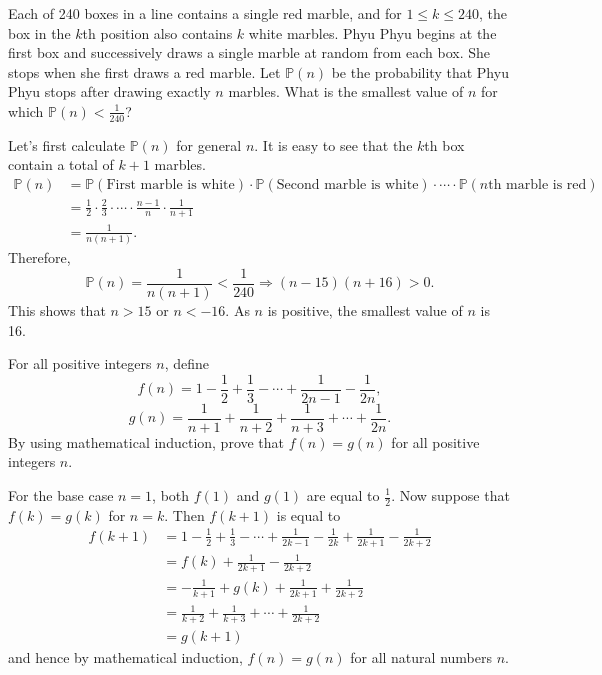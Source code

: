 \begin{question}
    Each of 240 boxes in a line contains a single red marble, and for $1 \leq k
    \leq 240$, the box in the $k$th position also contains $k$ white marbles.
    Phyu Phyu begins at the first box and successively draws a single marble at
    random from each box. She stops when she first draws a red marble. Let
    $\mathbb{P}(n)$ be the probability that Phyu Phyu stops after drawing
    exactly $n$ marbles. What is the smallest value of $n$ for which
    $\mathbb{P}(n) < \frac{1}{240}$?
\end{question}
\begin{solution}
    Let's first calculate $\mathbb{P}(n)$ for general $n$. It is easy to see
    that the $k$th box contain a total of $k + 1$ marbles.
    \begin{align*}
        \mathbb{P}(n) &= \mathbb{P}(\text{First marble is white}) \cdot \mathbb{P}(\text{Second marble is white}) \cdot \cdots \cdot \mathbb{P}(\text{$n$th marble is red})\\
        &= \frac{1}{2} \cdot \frac{2}{3} \cdot \cdots \cdot \frac{n - 1}{n} \cdot \frac{1}{n + 1}\\
        &= \frac{1}{n(n + 1)}.
    \end{align*}
    Therefore,
    \[ \mathbb{P}(n) = \frac{1}{n(n + 1)} < \frac{1}{240} \Longrightarrow (n -
    15)(n + 16) > 0. \]
    This shows that $n > 15$ or $n < -16$. As $n$ is positive, the smallest
    value of $n$ is 16.
\end{solution}

\begin{question}
    For all positive integers $n$, define 
    \[f(n) = 1 - \frac{1}{2} + \frac{1}{3} - \cdots + \frac{1}{2n-1} -
    \frac{1}{2n},\]
    \[g(n) = \frac{1}{n + 1} + \frac{1}{n + 2} + \frac{1}{n + 3} + \cdots +
    \frac{1}{2n}.\]
    By using mathematical induction, prove that $f(n) = g(n)$ for all positive
    integers $n$.
\end{question}
\begin{solution}
    For the base case $n = 1$, both $f(1)$ and $g(1)$ are equal to
    $\frac{1}{2}$. Now suppose that $f(k) = g(k)$ for $n = k$. Then $f(k + 1)$
    is equal to
    \begin{align*}
        f(k + 1) &= 1 - \frac{1}{2} + \frac{1}{3} - \cdots + \frac{1}{2k - 1} - \frac{1}{2k} + \frac{1}{2k + 1} - \frac{1}{2k + 2}\\
        &= f(k) + \frac{1}{2k + 1} - \frac{1}{2k + 2}\\
        &= - \frac{1}{k + 1} + g(k) + \frac{1}{2k + 1} + \frac{1}{2k + 2}\\
        &= \frac{1}{k + 2} + \frac{1}{k + 3} + \cdots + \frac{1}{2k + 2}\\
        &= g(k + 1)
    \end{align*}
    and hence by mathematical induction, $f(n) = g(n)$ for all natural numbers
    $n$.
\end{solution}

